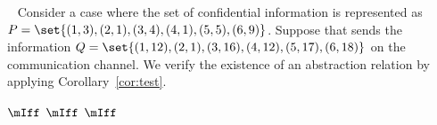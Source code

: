 \begin{example}~
\label{ex:test_fail}
	Consider a case where the set of confidential information is represented as $P = \set{(1,3),(2,1),(3,4),(4,1),(5,5),(6,9)}$. Suppose that \AgentOne sends the information $Q = \set{(1,12),(2,1),(3,16),(4,12),(5,17),(6,18)}$ on the communication channel. We verify the existence of an abstraction relation by applying Corollary~\ref{cor:test}. 
	
	\Beginproof
		$\mIff$ 
		$\mIff$ 
		\pred{$\false \Ors \false$}
		$\mIff$ 
		\pred{$\false$}
	\Endproof
	\vspace{-0.65in}

\end{example}